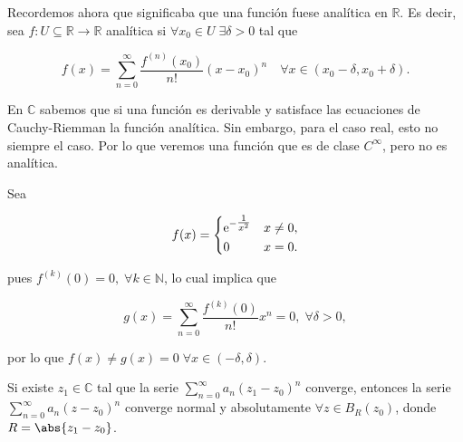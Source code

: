 \documentclass[../main.tex]{subfiles}
\begin{document}
\begin{remark}
    Recordemos ahora que significaba que una función fuese analítica en
    \(\mathbb{R}\). Es
    decir, sea \(f \colon U \subseteq \mathbb{R} \to \mathbb{R}\) analítica si \(\forall
    x_{0}\in U\; \exists \delta > 0\) tal que

    \begin{equation*}
        f(x) = \sum_{n = 0}^{\infty}\dfrac{f^{(n)}(x_{0})}{n!}(x -
        x_{0})^{n}\quad \forall
        x\in (x_{0} - \delta, x_{0} + \delta).
    \end{equation*}

    En \(\mathbb{C}\) sabemos que si una función es derivable y satisface las
    ecuaciones de
    Cauchy-Riemman la función analítica. Sin embargo, para el caso real, esto
    no siempre el
    caso. Por lo que veremos una función que es de clase \(C^{\infty}\), pero no es
    analítica.

    \begin{example}
        Sea

        \begin{equation*}
            f(x) =
            \begin{dcases}
                \mathrm{e}^{-\tfrac{1}{x^{2}}} & x \neq 0,\\
                0 & x = 0.
            \end{dcases}
        \end{equation*}

        pues \(f^{(k)}(0) = 0,\; \forall k\in \mathbb{N}\), lo cual implica que

        \begin{equation}
            g(x) = \sum_{n = 0}^{\infty}\dfrac{f^{(k)}(0)}{n!}x^{n} = 0,\;
            \forall \delta > 0,
        \end{equation}

        por lo que \(f(x) \neq g(x) = 0\; \forall x\in (-\delta, \delta)\).
    \end{example}
\end{remark}

\begin{lemma}[Abel]\label{lemma:abel}
    Si existe \(z_{1}\in \mathbb{C}\) tal que la serie \(\sum_{n =
    0}^{\infty}a_{n}(z_{1} - z_{0}) ^{n}\) converge, entonces la serie \(\sum_{n =
    0}^{\infty}a_{n}(z - z_{0})^{n}\) converge normal y absolutamente \(\forall z\in
    B_{R}(z_{0})\), donde \(R = \abs{z_{1} - z_{0}}\).
\end{lemma}
\end{document}
